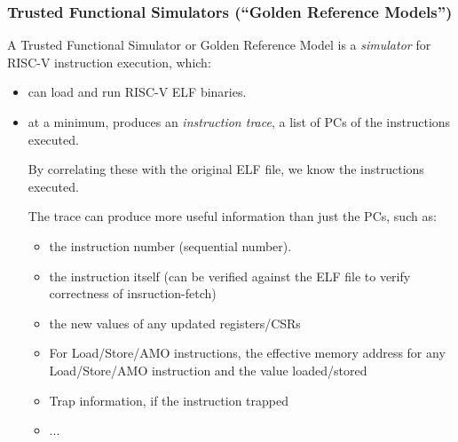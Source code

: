 \begin{frame}[fragile]
\frametitle{Trusted Functional Simulators (``Golden Reference Models'')}

\footnotesize

A Trusted Functional Simulator or Golden Reference Model is a
\emph{simulator} for RISC-V instruction execution, which:

\begin{itemize}

  \item can load and run RISC-V ELF binaries.

  \item at a minimum, produces an \emph{instruction trace}, {\ie} a
      list of PCs of the instructions executed.

      \vx
      By correlating these with the original ELF file, we know the
      instructions executed.

      \vx
      The trace can produce more useful information than just the PCs,
      such as:

      \vx
      \begin{itemize}\scriptsize
          \item the instruction number (sequential number).
          \item the instruction itself (can be verified against the
              ELF file to verify correctness of insruction-fetch)
          \item the new values of any updated registers/CSRs
          \item For Load/Store/AMO instructions, the effective memory
              address for any Load/Store/AMO instruction and the value
              loaded/stored
          \item Trap information, if the instruction trapped
          \item ...
      \end{itemize}
\end{itemize}

\end{frame}



